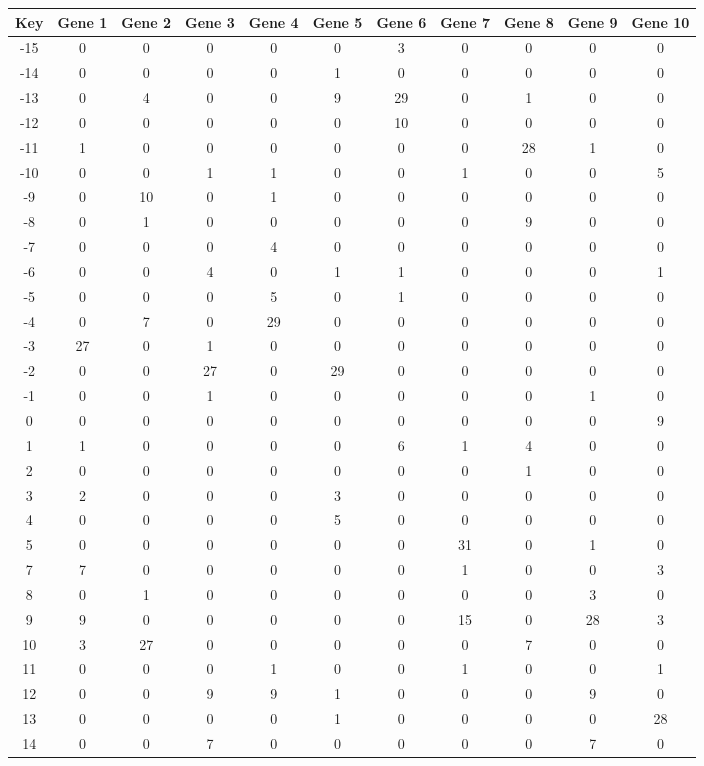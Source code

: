 \begin{tabular}{|c|c|c|c|c|c|c|c|c|c|c|}
\hline
Key & Gene 1 & Gene 2 & Gene 3 & Gene 4 & Gene 5 & Gene 6 & Gene 7 & Gene 8 & Gene 9 & Gene 10 \\
\hline
-15 & 0 & 0 & 0 & 0 & 0 & 3 & 0 & 0 & 0 & 0 \\
-14 & 0 & 0 & 0 & 0 & 1 & 0 & 0 & 0 & 0 & 0 \\
-13 & 0 & 4 & 0 & 0 & 9 & 29 & 0 & 1 & 0 & 0 \\
-12 & 0 & 0 & 0 & 0 & 0 & 10 & 0 & 0 & 0 & 0 \\
-11 & 1 & 0 & 0 & 0 & 0 & 0 & 0 & 28 & 1 & 0 \\
-10 & 0 & 0 & 1 & 1 & 0 & 0 & 1 & 0 & 0 & 5 \\
-9 & 0 & 10 & 0 & 1 & 0 & 0 & 0 & 0 & 0 & 0 \\
-8 & 0 & 1 & 0 & 0 & 0 & 0 & 0 & 9 & 0 & 0 \\
-7 & 0 & 0 & 0 & 4 & 0 & 0 & 0 & 0 & 0 & 0 \\
-6 & 0 & 0 & 4 & 0 & 1 & 1 & 0 & 0 & 0 & 1 \\
-5 & 0 & 0 & 0 & 5 & 0 & 1 & 0 & 0 & 0 & 0 \\
-4 & 0 & 7 & 0 & 29 & 0 & 0 & 0 & 0 & 0 & 0 \\
-3 & 27 & 0 & 1 & 0 & 0 & 0 & 0 & 0 & 0 & 0 \\
-2 & 0 & 0 & 27 & 0 & 29 & 0 & 0 & 0 & 0 & 0 \\
-1 & 0 & 0 & 1 & 0 & 0 & 0 & 0 & 0 & 1 & 0 \\
0 & 0 & 0 & 0 & 0 & 0 & 0 & 0 & 0 & 0 & 9 \\
1 & 1 & 0 & 0 & 0 & 0 & 6 & 1 & 4 & 0 & 0 \\
2 & 0 & 0 & 0 & 0 & 0 & 0 & 0 & 1 & 0 & 0 \\
3 & 2 & 0 & 0 & 0 & 3 & 0 & 0 & 0 & 0 & 0 \\
4 & 0 & 0 & 0 & 0 & 5 & 0 & 0 & 0 & 0 & 0 \\
5 & 0 & 0 & 0 & 0 & 0 & 0 & 31 & 0 & 1 & 0 \\
7 & 7 & 0 & 0 & 0 & 0 & 0 & 1 & 0 & 0 & 3 \\
8 & 0 & 1 & 0 & 0 & 0 & 0 & 0 & 0 & 3 & 0 \\
9 & 9 & 0 & 0 & 0 & 0 & 0 & 15 & 0 & 28 & 3 \\
10 & 3 & 27 & 0 & 0 & 0 & 0 & 0 & 7 & 0 & 0 \\
11 & 0 & 0 & 0 & 1 & 0 & 0 & 1 & 0 & 0 & 1 \\
12 & 0 & 0 & 9 & 9 & 1 & 0 & 0 & 0 & 9 & 0 \\
13 & 0 & 0 & 0 & 0 & 1 & 0 & 0 & 0 & 0 & 28 \\
14 & 0 & 0 & 7 & 0 & 0 & 0 & 0 & 0 & 7 & 0 \\
\hline
\end{tabular}